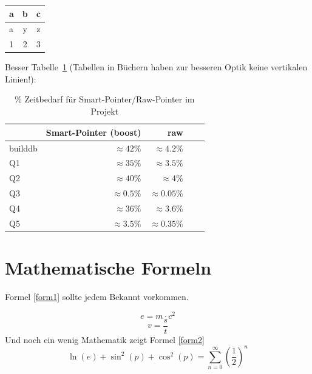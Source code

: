 \begin{center}
    \begin{tabular}{|l|cc|}
        \hline
        \hline
        a & b & c \\
        \hline
        \hline
        a & y  & z \\
        \hline
        1 & 2 & 3 \\
        \hline
        \hline
    \end{tabular}
\end{center}
Besser Tabelle~\ref{tbl:smartptrTime} (Tabellen in Büchern haben zur besseren Optik keine vertikalen Linien!):
\begin{table}[ht]
    \centering

    \caption{\% Zeitbedarf für Smart-Pointer/Raw-Pointer im Projekt}
    \begin{tabular}{lrrrr}
    \toprule
    ~ &  Smart-Pointer (boost) & raw &  & \\
    \midrule
    builddb &  $\approx 42\%$ & $\approx 4.2\%$ & &  \\
    \midrule
    Q1 & $\approx 35\%$ & $\approx 3.5\%$ & & \\
    Q2 & $\approx 40\%$ & $\approx 4\%$ & & \\
    Q3 & $\approx 0.5\%$& $\approx 0.05\%$ & & \\
    Q4 & $\approx 36\%$& $\approx 3.6\%$& & \\
    Q5 & $\approx 3.5\%$&$\approx 0.35\%$ & & \\

    \bottomrule

    \end{tabular}
    \label{tbl:smartptrTime}
\end{table}


\section{Mathematische Formeln}

Formel \ref{form1} sollte jedem Bekannt vorkommen.

\begin{equation}
    e = m \cdot c^2
    \label{form1}
\end{equation}
\[ v = \frac{s}{t} \]
Und noch ein wenig Mathematik zeigt Formel \ref{form2}
\begin{equation}
    \ln(e) + \sin^2(p) + \cos^2 (p) = \sum_{n=0}^{\infty} \left(\frac{1}{2}\right)^n
    \label{form2}
\end{equation}

